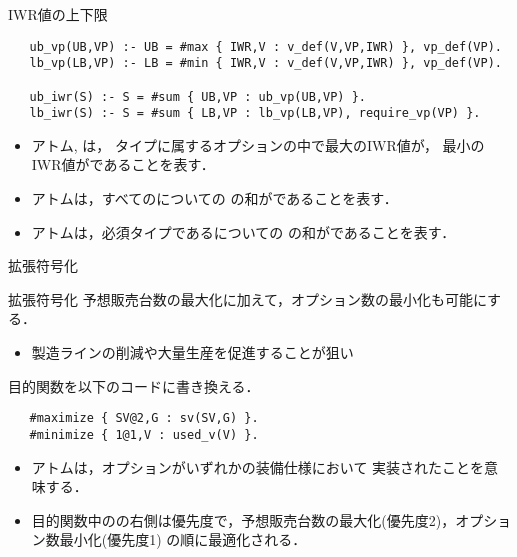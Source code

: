\documentclass[dvipdfmx, 11pt]{beamer}
\begin{document}
\begin{frame}[fragile]{IWR値の上下限}
 \begin{exampleblock}{}
  \footnotesize
  \begin{lstlisting}
   ub_vp(UB,VP) :- UB = #max { IWR,V : v_def(V,VP,IWR) }, vp_def(VP).
   lb_vp(LB,VP) :- LB = #min { IWR,V : v_def(V,VP,IWR) }, vp_def(VP).

   ub_iwr(S) :- S = #sum { UB,VP : ub_vp(UB,VP) }.
   lb_iwr(S) :- S = #sum { LB,VP : lb_vp(LB,VP), require_vp(VP) }.
  \end{lstlisting}
 \end{exampleblock}
 \begin{itemize}
  \item アトム, は，
	タイプに属するオプションの中で最大のIWR値が，
	最小のIWR値がであることを表す．
  \item アトムは，すべてのについての
	の和がであることを表す．
  \item アトムは，必須タイプであるについての
	の和がであることを表す．
 \end{itemize}
\end{frame}
\begin{frame}[fragile]{拡張符号化}
 \begin{block}{拡張符号化}
  予想販売台数の最大化に加えて，オプション数の最小化も可能にする．
  \begin{itemize}
   \item 製造ラインの削減や大量生産を促進することが狙い
  \end{itemize}
 \end{block}
 目的関数を以下のコードに書き換える．
 \begin{exampleblock}{}
  \begin{lstlisting}
   #maximize { SV@2,G : sv(SV,G) }.
   #minimize { 1@1,V : used_v(V) }.
  \end{lstlisting}
 \end{exampleblock}
 \begin{itemize}
  \item アトムは，オプションがいずれかの装備仕様において
	実装されたことを意味する．
  \item 目的関数中のの右側は優先度で，予想販売台数の最大化(優先度2)，オプション数最小化(優先度1)
	の順に最適化される．
 \end{itemize}
\end{frame}
\end{document}
